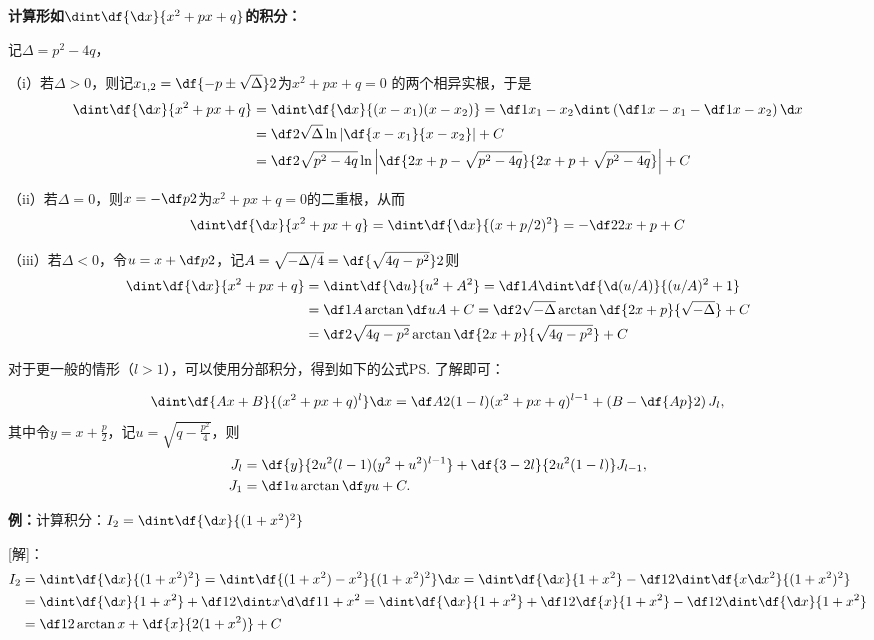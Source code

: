 \begin{shaded}
	{\bf 计算形如$\dint\df{\d x}{x^2+px+q}$的积分：}
	
	记$\Delta=p^2-4q$，
	
	（i）若$\Delta>0$，则记$x_{1,2}=\df{-p\pm\sqrt{\Delta}}2$为$x^2+px+q=0$
	的两个相异实根，于是
	\begin{align}
		\dint\df{\d x}{x^2+px+q}&=\dint\df{\d x}{(x-x_1)(x-x_2)}
		=\df1{x_1-x_2}\dint\left(\df1{x-x_1}-\df1{x-x_2}\right)\d x\notag\\
		&=\df2{\sqrt{\Delta}}\ln\left|\df{x-x_1}{x-x_2}\right|+C\notag\\
		&=\df2{\sqrt{p^2-4q}}\ln\left|\df{2x+p-\sqrt{p^2-4q}}
		{2x+p+\sqrt{p^2-4q}}\right|+C\notag
	\end{align}
	
	（ii）若$\Delta=0$，则$x=-\df p2$为$x^2+px+q=0$的二重根，从而
	$$\dint\df{\d x}{x^2+px+q}=\dint\df{\d x}{(x+p/2)^2}=-\df2{2x+p}+C$$
	
	（iii）若$\Delta<0$，令$u=x+\df p2$，记$A=\sqrt{-\Delta/4}=\df{\sqrt{4q-p^2}}2$则
	\begin{align}
		\dint\df{\d x}{x^2+px+q}&=\dint\df{\d u}{u^2+A^2}
		=\df1A\dint\df{\d(u/A)}{(u/A)^2+1}\notag\\
		&=\df1A\arctan\df uA+C=\df2{\sqrt{-\Delta}}
		\arctan\df{2x+p}{\sqrt{-\Delta}}+C\notag\\
		&=\df2{\sqrt{4q-p^2}}\arctan\df{2x+p}{\sqrt{4q-p^2}}+C\notag
	\end{align}
\end{shaded}

对于更一般的情形（$l>1$），可以使用分部积分，得到如下的公式\ps{了解即可}：

\begin{thx}
	$$\dint\df{Ax+B}{(x^2+px+q)^l}\d x=
	\df A{2(1-l)(x^2+px+q)^{l-1}}+\left(B-\df{Ap}2\right)J_l,$$
	其中令$y=x+\frac p2$，记$u=\sqrt{q-\frac{p^2}4}$，则
	\begin{align*}
		J_l&=\df{y}{2u^2(l-1)(y^2+u^2)^{l-1}}+
  		\df{3-2l}{2u^2(1-l)}J_{l-1},\\
  		J_1&=\df1u\arctan\df yu+C.	
	\end{align*}
\end{thx}

{\bf 例：}计算积分：$I_2=\dint\df{\d x}{(1+x^2)^2}$


[解]：
\begin{align}
	I_2&=\dint\df{\d x}{(1+x^2)^2}
	=\dint\df{(1+x^2)-x^2}{(1+x^2)^2}\d x
	=\dint\df{\d x}{1+x^2}-\df12\dint\df{x\d x^2}{(1+x^2)^2}\notag\\
	&=\dint\df{\d x}{1+x^2}+\df12\dint x\d\df1{1+x^2}\notag
	=\dint\df{\d x}{1+x^2}+\df12\df{x}{1+x^2}
	-\df12\dint\df{\d x}{1+x^2}\notag\\
	&=\df12\arctan x+\df{x}{2(1+x^2)}+C\notag
\end{align}
\fin

